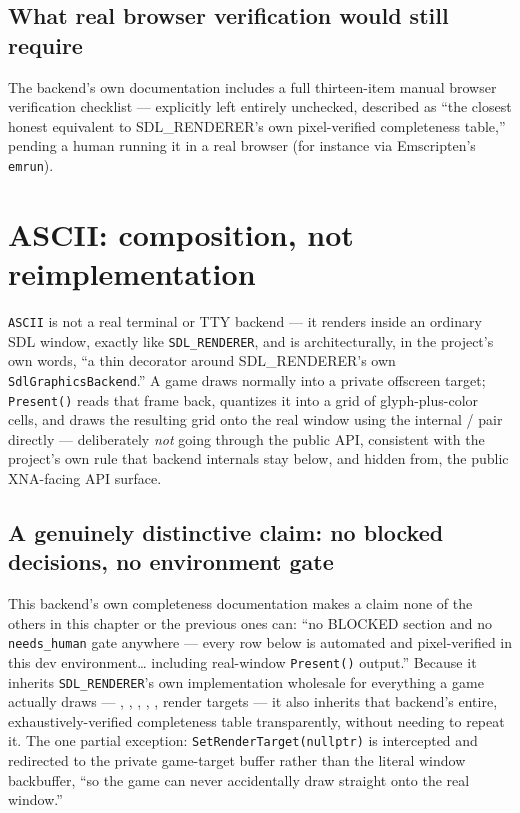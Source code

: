 \subsection{What real browser verification would still require}

The backend's own documentation includes a full thirteen-item manual browser verification
checklist --- explicitly left entirely unchecked, described as ``the closest honest
equivalent to SDL\_RENDERER's own pixel-verified completeness table,'' pending a human
running it in a real browser (for instance via Emscripten's \texttt{emrun}).

\section{ASCII: composition, not reimplementation}

\texttt{ASCII} is not a real terminal or TTY backend --- it renders inside an ordinary SDL
window, exactly like \texttt{SDL\_RENDERER}, and is architecturally, in the project's own
words, ``a thin decorator around SDL\_RENDERER's own \texttt{SdlGraphicsBackend}.'' A game
draws normally into a private offscreen target; \texttt{Present()} reads that frame back,
quantizes it into a grid of glyph-plus-color cells, and draws the resulting grid onto the
real window using the internal  / 
pair directly --- deliberately \emph{not} going through the public  API,
consistent with the project's own rule that backend internals stay below, and hidden from,
the public XNA-facing API surface.

\subsection{A genuinely distinctive claim: no blocked decisions, no environment gate}

This backend's own completeness documentation makes a claim none of the others in this
chapter or the previous ones can: ``no BLOCKED section and no \texttt{needs\_human} gate
anywhere --- every row below is automated and pixel-verified in this dev environment\ldots
including real-window \texttt{Present()} output.'' Because it inherits \texttt{SDL\_RENDERER}'s
own implementation wholesale for everything a game actually draws --- ,
, , , ,
render targets --- it also inherits that backend's entire, exhaustively-verified completeness
table transparently, without needing to repeat it. The one partial exception:
\texttt{SetRenderTarget(nullptr)} is intercepted and redirected to the private game-target
buffer rather than the literal window backbuffer, ``so the game can never accidentally draw
straight onto the real window.''

